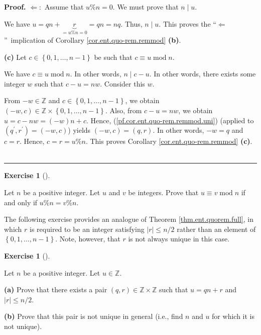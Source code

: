 \documentclass[numbers=enddot,12pt,final,onecolumn,notitlepage]{scrartcl}%
\newcounter{exer}
\numberwithin{exer}{subsection}
\theoremstyle{definition}
\newtheorem{exmp}[exer]{Exercise}
\newenvironment{exercise}[1][]
{\begin{exmp}[#1]\begin{leftbar}}
{\end{leftbar}\end{exmp}}
\newenvironment{proof}[1][Proof]{\noindent\textbf{#1.} }{\ \rule{0.5em}{0.5em}}
\begin{document}
\begin{proof}
$\Longleftarrow:$ Assume that $u\%n=0$. We must prove that $n\mid u$.

We have $u=qn+\underbrace{r}_{=u\%n=0}=qn=nq$. Thus, $n\mid u$. This proves
the \textquotedblleft$\Longleftarrow$\textquotedblright\ implication of
Corollary \ref{cor.ent.quo-rem.remmod} \textbf{(b)}.

\textbf{(c)} Let $c\in\left\{  0,1,\ldots,n-1\right\}  $ be such that $c\equiv
u\operatorname{mod}n$.

We have $c\equiv u\operatorname{mod}n$. In other words, $n\mid c-u$. In other
words, there exists some integer $w$ such that $c-u=nw$. Consider this $w$.

From $-w\in\mathbb{Z}$ and $c\in\left\{  0,1,\ldots,n-1\right\}  $, we obtain
$\left(  -w,c\right)  \in\mathbb{Z}\times\left\{  0,1,\ldots,n-1\right\}  $.
Also, from $c-u=nw$, we obtain $u=c-nw=\left(  -w\right)  n+c$. Hence,
(\ref{pf.cor.ent.quo-rem.remmod.uni}) (applied to $\left(  q^{\prime
},r^{\prime}\right)  =\left(  -w,c\right)  $) yields $\left(  -w,c\right)
=\left(  q,r\right)  $. In other words, $-w=q$ and $c=r$. Hence, $c=r=u\%n$.
This proves Corollary \ref{cor.ent.quo-rem.remmod} \textbf{(c)}.
\end{proof}

\begin{exercise}
\label{exe.ent.quo-rem.mod=rem}Let $n$ be a positive integer. Let $u$ and $v$
be integers. Prove that $u\equiv v\operatorname{mod}n$ if and only if
$u\%n=v\%n$.
\end{exercise}

The following exercise provides an analogue of Theorem
\ref{thm.ent.quorem.full}, in which $r$ is required to be an integer
satisfying $\left\vert r\right\vert \leq n/2$ rather than an element of
$\left\{  0,1,\ldots,n-1\right\}  $. Note, however, that $r$ is not always
unique in this case.

\begin{exercise}
\label{exe.ent.quo-rem.minrem}Let $n$ be a positive integer. Let
$u\in\mathbb{Z}$.

\textbf{(a)} Prove that there exists a pair $\left(  q,r\right)  \in
\mathbb{Z}\times\mathbb{Z}$ such that $u=qn+r$ and $\left\vert r\right\vert
\leq n/2$.

\textbf{(b)} Prove that this pair is not unique in general (i.e., find $n$ and
$u$ for which it is not unique).
\end{exercise}
\end{document}
